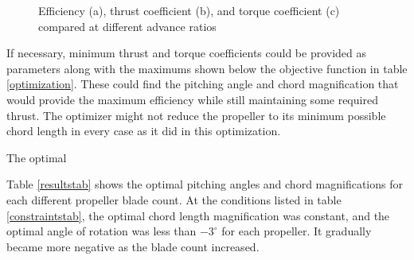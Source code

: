 \documentclass[journal ]{new-aiaa}
\begin{document}
\begin{figure}[H]
\centering

	\hspace{1em}
	\caption{Efficiency (a), thrust coefficient (b), and torque coefficient (c) compared at different advance ratios}
	\captionsetup{aboveskip=0pt,font=it}
	\label{efftqtab}
\end{figure}

If necessary, minimum thrust and torque coefficients could be provided as parameters along with the maximums shown below the objective function in table \ref{optimization}. These could find the pitching angle and chord magnification that would provide the maximum efficiency while still maintaining some required thrust. The optimizer might not reduce the propeller to its minimum possible chord length in every case as it did in this optimization.

The optimal 

Table \ref{resultstab} shows the optimal pitching angles and chord magnifications for each different propeller blade count. At the conditions listed in table \ref{constraintstab}, the optimal chord length magnification was constant, and the optimal angle of rotation was less than $-3^{\circ}$ for each propeller. It gradually became more negative as the blade count increased.
\end{document}
